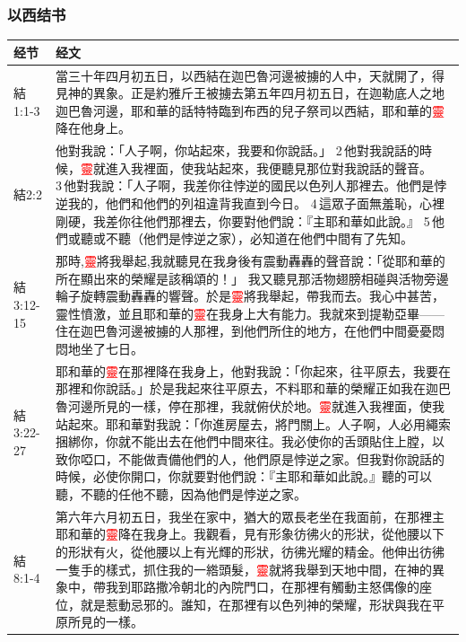 \subsubsection{以西结书}
\begin{table}[H]
\centering
\begin{tabular}{p{5em}p{45em}}  \toprule
经节&经文 \\  \midrule
結1:1-3&當三十年四月初五日，以西結在迦巴魯河邊被擄的人中，天就開了，得見神的異象。正是約雅斤王被擄去第五年四月初五日，在迦勒底人之地迦巴魯河邊，耶和華的話特特臨到布西的兒子祭司以西結，耶和華的\textcolor{red}{靈}降在他身上。 \\  \midrule


結2:2&他對我說：「人子啊，你站起來，我要和你說話。」 2 他對我說話的時候，\textcolor{red}{靈}就進入我裡面，使我站起來，我便聽見那位對我說話的聲音。 3 他對我說：「人子啊，我差你往悖逆的國民以色列人那裡去。他們是悖逆我的，他們和他們的列祖違背我直到今日。 4 這眾子面無羞恥，心裡剛硬，我差你往他們那裡去，你要對他們說：『主耶和華如此說。』 5 他們或聽或不聽（他們是悖逆之家），必知道在他們中間有了先知。\\  \midrule

結3:12-15&那時,\textcolor{red}{靈}將我舉起,我就聽見在我身後有震動轟轟的聲音說：「從耶和華的所在顯出來的榮耀是該稱頌的！」 我又聽見那活物翅膀相碰與活物旁邊輪子旋轉震動轟轟的響聲。於是\textcolor{red}{靈}將我舉起，帶我而去。我心中甚苦，靈性憤激，並且耶和華的\textcolor{red}{靈}在我身上大有能力。我就來到提勒亞畢——住在迦巴魯河邊被擄的人那裡，到他們所住的地方，在他們中間憂憂悶悶地坐了七日。\\  \midrule

結3:22-27&耶和華的\textcolor{red}{靈}在那裡降在我身上，他對我說：「你起來，往平原去，我要在那裡和你說話。」於是我起來往平原去，不料耶和華的榮耀正如我在迦巴魯河邊所見的一樣，停在那裡，我就俯伏於地。\textcolor{red}{靈}就進入我裡面，使我站起來。耶和華對我說：「你進房屋去，將門關上。人子啊，人必用繩索捆綁你，你就不能出去在他們中間來往。我必使你的舌頭貼住上膛，以致你啞口，不能做責備他們的人，他們原是悖逆之家。但我對你說話的時候，必使你開口，你就要對他們說：『主耶和華如此說。』聽的可以聽，不聽的任他不聽，因為他們是悖逆之家。\\  \midrule

結8:1-4&第六年六月初五日，我坐在家中，猶大的眾長老坐在我面前，在那裡主耶和華的\textcolor{red}{靈}降在我身上。我觀看，見有形象彷彿火的形狀，從他腰以下的形狀有火，從他腰以上有光輝的形狀，彷彿光耀的精金。他伸出彷彿一隻手的樣式，抓住我的一綹頭髮，\textcolor{red}{靈}就將我舉到天地中間，在神的異象中，帶我到耶路撒冷朝北的內院門口，在那裡有觸動主怒偶像的座位，就是惹動忌邪的。誰知，在那裡有以色列神的榮耀，形狀與我在平原所見的一樣。\\  \midrule



\end{tabular}
\end{table}
